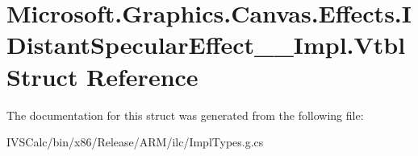\hypertarget{struct_microsoft_1_1_graphics_1_1_canvas_1_1_effects_1_1_i_distant_specular_effect_____impl_1_1_vtbl}{}\section{Microsoft.\+Graphics.\+Canvas.\+Effects.\+I\+Distant\+Specular\+Effect\+\_\+\+\_\+\+Impl.\+Vtbl Struct Reference}
\label{struct_microsoft_1_1_graphics_1_1_canvas_1_1_effects_1_1_i_distant_specular_effect_____impl_1_1_vtbl}


The documentation for this struct was generated from the following file\+:\begin{DoxyCompactItemize}
\item 
I\+V\+S\+Calc/bin/x86/\+Release/\+A\+R\+M/ilc/Impl\+Types.\+g.\+cs\end{DoxyCompactItemize}
